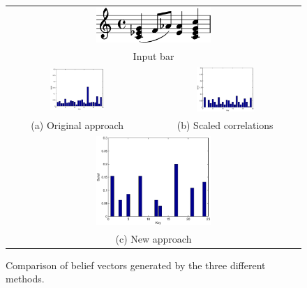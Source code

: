 \documentclass[11pt]{article} %
\begin{document}
\begin{figure}[h]
\centering

\begin{tabular}{cc}

\multicolumn{2}{c}{\includegraphics[width=0.4\textwidth] {belief.png}}\\
\multicolumn{2}{c}{Input bar}\\
\includegraphics[width=0.4\textwidth]{belieforiginal.eps} & \includegraphics[width=0.4\textwidth]{beliefcorrelation.eps}\\
(a) Original approach & (b) Scaled correlations \\
\multicolumn{2}{c}{ \includegraphics[width=0.4\textwidth]{beliefnew.eps}} \\
\multicolumn{2}{c}{(c) New approach}
\end{tabular}
\caption{Comparison of belief vectors generated by the three different methods.}
\label{fig:belief}
\end{figure}
\end{document}
